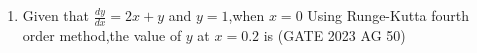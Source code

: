 \begin{enumerate}[label=\thechapter.\arabic*,ref=\thechapter.\theenumi]
\item Given that $\frac{dy}{dx}=2x+y$ and $y=1$,when $x=0$ Using Runge-Kutta fourth order method,the value of $y$ at $x=0.2$ is \hfill(GATE 2023 AG 50) \\

\solution
\end{enumerate}
